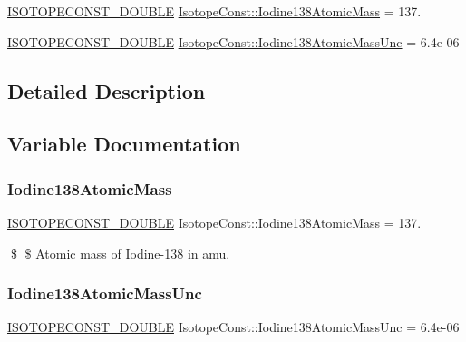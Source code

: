 \begin{DoxyCompactItemize}
\item 
\mbox{\hyperlink{group___isotope_const-_macros_ga8f45a7272ce02c0b4c65c44636ed719a}{I\+S\+O\+T\+O\+P\+E\+C\+O\+N\+S\+T\+\_\+\+D\+O\+U\+B\+LE}} \mbox{\hyperlink{group___isotope_const-_iodine-_i138_gaf4e7bc3b23931de35d33ee824b46b762}{Isotope\+Const\+::\+Iodine138\+Atomic\+Mass}} = 137.
\item 
\mbox{\hyperlink{group___isotope_const-_macros_ga8f45a7272ce02c0b4c65c44636ed719a}{I\+S\+O\+T\+O\+P\+E\+C\+O\+N\+S\+T\+\_\+\+D\+O\+U\+B\+LE}} \mbox{\hyperlink{group___isotope_const-_iodine-_i138_gab82d9ef84e2af16905d29500c7fc502d}{Isotope\+Const\+::\+Iodine138\+Atomic\+Mass\+Unc}} = 6.\+4e-\/06
\end{DoxyCompactItemize}


\subsection{Detailed Description}


\subsection{Variable Documentation}
\mbox{\label{group___isotope_const-_iodine-_i138_gaf4e7bc3b23931de35d33ee824b46b762}} 
\subsubsection{\texorpdfstring{Iodine138\+Atomic\+Mass}{Iodine138AtomicMass}}
{\footnotesize\ttfamily \mbox{\hyperlink{group___isotope_const-_macros_ga8f45a7272ce02c0b4c65c44636ed719a}{I\+S\+O\+T\+O\+P\+E\+C\+O\+N\+S\+T\+\_\+\+D\+O\+U\+B\+LE}} Isotope\+Const\+::\+Iodine138\+Atomic\+Mass = 137.}

\$ \$ Atomic mass of Iodine-\/138 in amu. \mbox{\label{group___isotope_const-_iodine-_i138_gab82d9ef84e2af16905d29500c7fc502d}} 
\subsubsection{\texorpdfstring{Iodine138\+Atomic\+Mass\+Unc}{Iodine138AtomicMassUnc}}
{\footnotesize\ttfamily \mbox{\hyperlink{group___isotope_const-_macros_ga8f45a7272ce02c0b4c65c44636ed719a}{I\+S\+O\+T\+O\+P\+E\+C\+O\+N\+S\+T\+\_\+\+D\+O\+U\+B\+LE}} Isotope\+Const\+::\+Iodine138\+Atomic\+Mass\+Unc = 6.\+4e-\/06}

